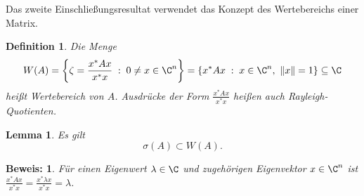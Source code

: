 \documentclass[
]{mycourse}
\theoremstyle{mythm}
\newtheorem{lemma}[theorem]{Lemma}
\newtheorem{definition}[theorem]{Definition}
\theoremstyle{break}
\newtheorem*{beweis}{Beweis:}
\newcommand{\norm}[1]{\left\Vert#1\right\Vert}		%
\newcommand{\dd}{\; : \;}    			      	%
\begin{document}
Das zweite Einschließungsresultat verwendet das Konzept des Wertebereichs einer Matrix.
\begin{definition}
Die Menge
\[
W(A)=\left\{ \zeta=\frac{x^* A x}{x^* x} \dd 0\neq x\in \C^n \right\}=\left\{ x^* A x \dd x\in \C^n,\ \norm{x}=1\right\}\subseteq \C
\]
heißt \emph{Wertebereich} von $A$. Ausdrücke der Form $\frac{x^* A x}{x^* x}$ heißen auch \emph{Rayleigh-Quotienten}.
\end{definition}


\begin{lemma}\label{lemma:W_enthaelt_sigma}
Es gilt
\[
\sigma(A)\subset W(A).
\]
\end{lemma}
\begin{beweis}
Für einen Eigenwert $\lambda\in \C$ und zugehörigen Eigenvektor $x\in \C^n$ ist
$\frac{x^* A x}{x^*x}=\frac{x^* \lambda x}{x^*x}=\lambda$. 
\end{beweis}

\end{document}
